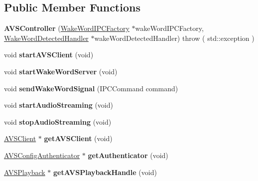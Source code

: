 \subsection*{Public Member Functions}
\begin{DoxyCompactItemize}
\item 
\mbox{\label{classAVSController_a63d0d4f3504598a6cf631d743221148c}} 
{\bfseries A\+V\+S\+Controller} (\hyperlink{classWakeWord_1_1WakeWordIPCFactory}{Wake\+Word\+I\+P\+C\+Factory} $\ast$wake\+Word\+I\+P\+C\+Factory, \hyperlink{classWakeWord_1_1WakeWordDetectedHandler}{Wake\+Word\+Detected\+Handler} $\ast$wake\+Word\+Detected\+Handler)  throw ( std\+::exception )
\item 
\mbox{\label{classAVSController_a7e82175b8fa5864d1ec17509dc0298c9}} 
void {\bfseries start\+A\+V\+S\+Client} (void)
\item 
\mbox{\label{classAVSController_aaf6ac00abc79561f81fe932df6226ec0}} 
void {\bfseries start\+Wake\+Word\+Server} (void)
\item 
\mbox{\label{classAVSController_a68695f1c999d840021878ca1eaa4ac78}} 
void {\bfseries send\+Wake\+Word\+Signal} (I\+P\+C\+Command command)
\item 
\mbox{\label{classAVSController_af4e3b90cc19b84dc38a6035dfa7fc700}} 
void {\bfseries start\+Audio\+Streaming} (void)
\item 
\mbox{\label{classAVSController_ab692b03c8cdb638ef397c2a983bb43b1}} 
void {\bfseries stop\+Audio\+Streaming} (void)
\item 
\mbox{\label{classAVSController_ae0c0e24cfb2a347ceaf16698f1971c52}} 
\hyperlink{classAVSClient}{A\+V\+S\+Client} $\ast$ {\bfseries get\+A\+V\+S\+Client} (void)
\item 
\mbox{\label{classAVSController_a5e28e26ddb32663fe918809cd2da50b5}} 
\hyperlink{classAVSConfigAuthenticator}{A\+V\+S\+Config\+Authenticator} $\ast$ {\bfseries get\+Authenticator} (void)
\item 
\mbox{\label{classAVSController_ae1a6b6f95f9e2ac206e2724e33f57741}} 
\hyperlink{classAVSPlayback}{A\+V\+S\+Playback} $\ast$ {\bfseries get\+A\+V\+S\+Playback\+Handle} (void)
\end{DoxyCompactItemize}
